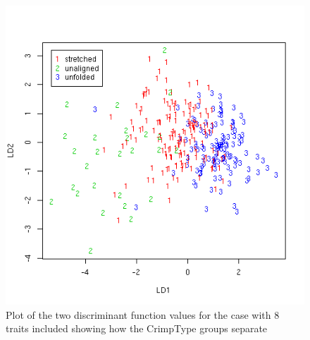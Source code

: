 %

\begin{figure}[!h]
  \centering
  \includegraphics[width=1.1\textwidth]{figlda8.png}
  \caption{Plot of the two discriminant function values for the case with 8 traits included showing how the CrimpType groups separate}
  \label{fig:lda8}
\end{figure}

%

